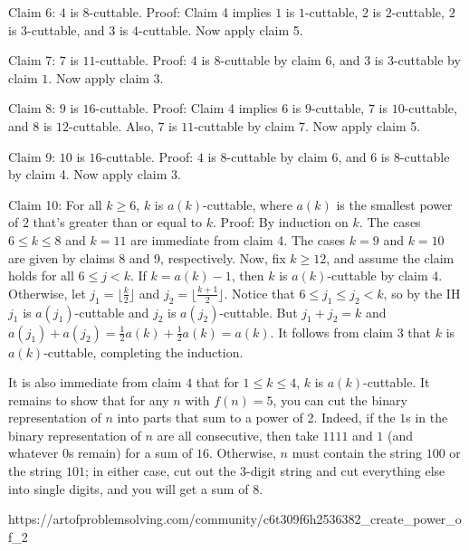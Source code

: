 \documentclass[a4paper]{article}
\begin{document}
\begin{question*}{}
{        Claim 6: $4$ is $8$-cuttable.
        Proof: Claim 4 implies $1$ is $1$-cuttable, $2$ is $2$-cuttable, $2$ is $3$-cuttable, and $3$ is $4$-cuttable. Now apply claim 5.

        Claim 7: $7$ is $11$-cuttable.
        Proof: $4$ is $8$-cuttable by claim 6, and $3$ is $3$-cuttable by claim $1$. Now apply claim 3.

        Claim 8: $9$ is $16$-cuttable.
        Proof: Claim 4 implies $6$ is $9$-cuttable, $7$ is $10$-cuttable, and $8$ is $12$-cuttable. Also, $7$ is $11$-cuttable by claim 7. Now apply claim 5.

        Claim 9: $10$ is $16$-cuttable.
        Proof: $4$ is $8$-cuttable by claim 6, and $6$ is $8$-cuttable by claim 4. Now apply claim 3.

        Claim 10: For all $k \geq 6$, $k$ is $a(k)$-cuttable, where $a(k)$ is the smallest power of $2$ that's greater than or equal to $k$.
        Proof: By induction on $k$. The cases $6 \leq k \leq 8$ and $k = 11$ are immediate from claim 4. The cases $k = 9$ and $k = 10$ are given by claims 8 and 9, respectively. Now, fix $k \geq 12$, and assume the claim holds for all $6 \leq j < k$. If $k = a(k) - 1$, then $k$ is $a(k)$-cuttable by claim 4. Otherwise, let $j_1 = \lfloor\tfrac{k}{2}\rfloor$ and $j_2 = \lfloor\tfrac{k+1}{2}\rfloor$. Notice that $6 \leq j_1 \leq j_2 < k$, so by the IH $j_1$ is $a(j_1)$-cuttable and $j_2$ is $a(j_2)$-cuttable. But $j_1 + j_2 = k$ and $a(j_1) + a(j_2) = \tfrac{1}{2}a(k) + \tfrac{1}{2}a(k) = a(k)$. It follows from claim 3 that $k$ is $a(k)$-cuttable, completing the induction.

        It is also immediate from claim $4$ that for $1 \leq k \leq 4$, $k$ is $a(k)$-cuttable. It remains to show that for any $n$ with $f(n) = 5$, you can cut the binary representation of $n$ into parts that sum to a power of 2. Indeed, if the $1$s in the binary representation of $n$ are all consecutive, then take $1111$ and $1$ (and whatever $0$s remain) for a sum of $16$. Otherwise, $n$ must contain the string $100$ or the string $101$; in either case, cut out the 3-digit string and cut everything else into single digits, and you will get a sum of $8$.
        }{%
        https://artofproblemsolving.com/community/c6t309f6h2536382_create_power_of_2
    }

\end{question*}
\end{document}

